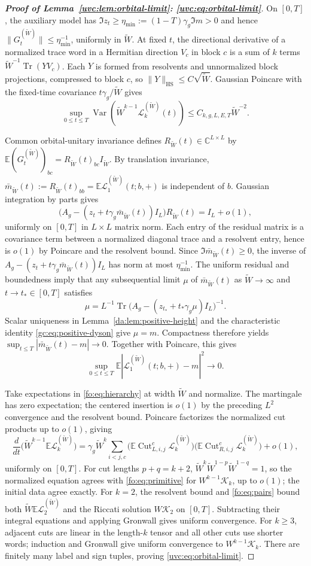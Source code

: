 \documentclass[11pt]{article}
\numberwithin{equation}{section}
\theoremstyle{remark}
\newcommand{\E}{\mathbb E}
\newcommand{\C}{\mathbb C}
\newcommand{\Tr}{\operatorname{Tr}}
\newcommand{\wt}{\widetilde}
\newcommand{\cL}{\mathcal L}
\newcommand{\cK}{\mathcal K}
\begin{document}
\begin{proof}[\textbf{Proof of Lemma~\ref{uvc:lem:orbital-limit}: \eqref{uvc:eq:orbital-limit}}]
On $[0,T]$, the auxiliary model has
$\Im z_t\ge\eta_{\min}:=(1-T)\gamma_g\Im m>0$ and hence
$\|G_t^{(\wt W)}\|\le\eta_{\min}^{-1}$, uniformly in $\wt W$.
At fixed $t$, the directional derivative of a normalized trace word
in a Hermitian direction $V_c$ in block $c$ is a sum of $k$ terms
$\wt W^{-1}\Tr(YV_c)$. Each $Y$ is formed from resolvents and
unnormalized block projections, compressed to block $c$, so
$\|Y\|_{\mathrm{HS}}\le C\sqrt{\wt W}$.
Gaussian Poincare with the fixed-time covariance $t\gamma_g/\wt W$ gives
\[
 \sup_{0\le t\le T}
 \operatorname{Var}(\wt W^{k-1}\cL_k^{(\wt W)}(t))
 \le C_{k,g,L,E,T}\wt W^{-2}.
\]

Common orbital-unitary invariance defines $R_{\wt W}(t)\in\C^{L\times L}$ by
$\E(G_t^{(\wt W)})_{bc}=R_{\wt W}(t)_{bc}I_{\wt W}$.
By translation invariance,
$\bar m_{\wt W}(t):=R_{\wt W}(t)_{bb}=\E\cL_1^{(\wt W)}(t;b,+)$
is independent of $b$. Gaussian integration by parts gives
\[
 \bigl(A_g-(z_t+t\gamma_g\bar m_{\wt W}(t))I_L\bigr)R_{\wt W}(t)=I_L+o(1),
\]
uniformly on $[0,T]$ in $L\times L$ matrix norm. Each entry of the
residual matrix is a covariance term between a normalized diagonal trace
and a resolvent entry, hence is $o(1)$ by Poincare and the resolvent bound.
Since $\Im\bar m_{\wt W}(t)\ge0$, the inverse of
$A_g-(z_t+t\gamma_g\bar m_{\wt W}(t))I_L$ has norm at most $\eta_{\min}^{-1}$.
The uniform residual and boundedness imply that any subsequential limit
$\mu$ of $\bar m_{\wt W}(t)$ as $\wt W\to\infty$ and $t\to t_*\in[0,T]$ satisfies
\[
 \mu=L^{-1}\Tr\bigl(A_g-(z_{t_*}+t_*\gamma_g\mu)I_L\bigr)^{-1}.
\]
Scalar uniqueness in Lemma~\ref{da:lem:positive-height} and the characteristic
identity \eqref{gc:eq:positive-dyson} give $\mu=m$. Compactness therefore yields
$\sup_{t\le T}|\bar m_{\wt W}(t)-m|\to0$.
Together with Poincare, this gives
\[
 \sup_{0\le t\le T}\E|\cL_1^{(\wt W)}(t;b,+)-m|^2\longrightarrow0.
\]

Take expectations in \eqref{fo:eq:hierarchy} at width $\wt W$ and normalize.
The martingale has zero expectation; the centered insertion is $o(1)$
by the preceding $L^2$ convergence and the resolvent bound.
Poincare factorizes the normalized cut products up to $o(1)$, giving
\[
 \frac{d}{dt}\bigl(\wt W^{k-1}\E\cL_k^{(\wt W)}\bigr)
 =\gamma_g\wt W^k\sum_{i<j,c}
       \bigl(\E\operatorname{Cut}_{L,i,j}^c\cL_k^{(\wt W)}\bigr)
       \bigl(\E\operatorname{Cut}_{R,i,j}^c\cL_k^{(\wt W)}\bigr)+o(1),
\]
uniformly on $[0,T]$. For cut lengths $p+q=k+2$,
$\wt W^k\wt W^{1-p}\wt W^{1-q}=1$, so the normalized equation agrees
with \eqref{fo:eq:primitive} for $W^{k-1}\cK_k$, up to $o(1)$;
the initial data agree exactly.
For $k=2$, the resolvent bound and \eqref{fo:eq:pairs} bound both
$\wt W\E\cL_2^{(\wt W)}$ and the Riccati solution $W\cK_2$ on $[0,T]$.
Subtracting their integral equations and applying Gronwall gives uniform convergence.
For $k\ge3$, adjacent cuts are linear in the length-$k$ tensor and
all other cuts use shorter words; induction and Gronwall give
uniform convergence to $W^{k-1}\cK_k$.
There are finitely many label and sign tuples, proving
\eqref{uvc:eq:orbital-limit}.
\end{proof}
\end{document}

